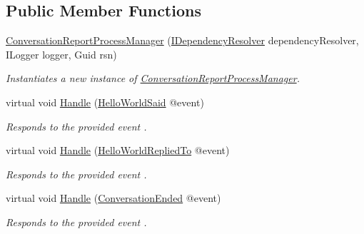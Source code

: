\subsection*{Public Member Functions}
\begin{DoxyCompactItemize}
\item 
\hyperlink{classCqrs_1_1Akka_1_1Tests_1_1Unit_1_1Sagas_1_1ConversationReportProcessManager_a646ce30aa269388c16820418c5b3f63c_a646ce30aa269388c16820418c5b3f63c}{Conversation\+Report\+Process\+Manager} (\hyperlink{interfaceCqrs_1_1Configuration_1_1IDependencyResolver}{I\+Dependency\+Resolver} dependency\+Resolver, I\+Logger logger, Guid rsn)
\begin{DoxyCompactList}\small\item\em Instantiates a new instance of \hyperlink{classCqrs_1_1Akka_1_1Tests_1_1Unit_1_1Sagas_1_1ConversationReportProcessManager}{Conversation\+Report\+Process\+Manager}. \end{DoxyCompactList}\item 
virtual void \hyperlink{classCqrs_1_1Akka_1_1Tests_1_1Unit_1_1Sagas_1_1ConversationReportProcessManager_a282356c4090cfaf2dcfa93916b8b8997_a282356c4090cfaf2dcfa93916b8b8997}{Handle} (\hyperlink{classCqrs_1_1Akka_1_1Tests_1_1Unit_1_1Events_1_1HelloWorldSaid}{Hello\+World\+Said} @event)
\begin{DoxyCompactList}\small\item\em Responds to the provided {\itshape event} . \end{DoxyCompactList}\item 
virtual void \hyperlink{classCqrs_1_1Akka_1_1Tests_1_1Unit_1_1Sagas_1_1ConversationReportProcessManager_a4c98fb5ce16b16e709c31c2fb2eff575_a4c98fb5ce16b16e709c31c2fb2eff575}{Handle} (\hyperlink{classCqrs_1_1Akka_1_1Tests_1_1Unit_1_1Events_1_1HelloWorldRepliedTo}{Hello\+World\+Replied\+To} @event)
\begin{DoxyCompactList}\small\item\em Responds to the provided {\itshape event} . \end{DoxyCompactList}\item 
virtual void \hyperlink{classCqrs_1_1Akka_1_1Tests_1_1Unit_1_1Sagas_1_1ConversationReportProcessManager_a2980f91992185b3275ba36e97e5eed48_a2980f91992185b3275ba36e97e5eed48}{Handle} (\hyperlink{classCqrs_1_1Akka_1_1Tests_1_1Unit_1_1Events_1_1ConversationEnded}{Conversation\+Ended} @event)
\begin{DoxyCompactList}\small\item\em Responds to the provided {\itshape event} . \end{DoxyCompactList}\item 

\end{DoxyCompactItemize}

